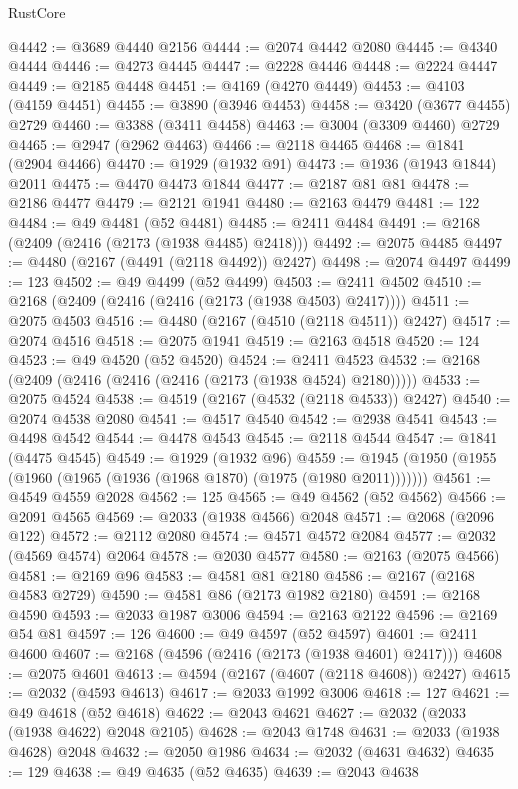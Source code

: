 \begin{lexlean}{RustCore}
\begin{coremodule}
@4442 := @3689 @4440 @2156
@4444 := @2074 @4442 @2080
@4445 := @4340 @4444
@4446 := @4273 @4445
@4447 := @2228 @4446
@4448 := @2224 @4447
@4449 := @2185 @4448
@4451 := @4169 (@4270 @4449)
@4453 := @4103 (@4159 @4451)
@4455 := @3890 (@3946 @4453)
@4458 := @3420 (@3677 @4455) @2729
@4460 := @3388 (@3411 @4458)
@4463 := @3004 (@3309 @4460) @2729
@4465 := @2947 (@2962 @4463)
@4466 := @2118 @4465
@4468 := @1841 (@2904 @4466)
@4470 := @1929 (@1932 @91)
@4473 := @1936 (@1943 @1844) @2011
@4475 := @4470 @4473 @1844
@4477 := @2187 @81 @81
@4478 := @2186 @4477
@4479 := @2121 @1941
@4480 := @2163 @4479
@4481 := 122
@4484 := @49 @4481 (@52 @4481)
@4485 := @2411 @4484
@4491 := @2168 (@2409 (@2416 (@2173 (@1938 @4485) @2418)))
@4492 := @2075 @4485
@4497 := @4480 (@2167 (@4491 (@2118 @4492)) @2427)
@4498 := @2074 @4497
@4499 := 123
@4502 := @49 @4499 (@52 @4499)
@4503 := @2411 @4502
@4510 := @2168 (@2409 (@2416 (@2416 (@2173 (@1938 @4503) @2417))))
@4511 := @2075 @4503
@4516 := @4480 (@2167 (@4510 (@2118 @4511)) @2427)
@4517 := @2074 @4516
@4518 := @2075 @1941
@4519 := @2163 @4518
@4520 := 124
@4523 := @49 @4520 (@52 @4520)
@4524 := @2411 @4523
@4532 := @2168 (@2409 (@2416 (@2416 (@2416 (@2173 (@1938 @4524) @2180)))))
@4533 := @2075 @4524
@4538 := @4519 (@2167 (@4532 (@2118 @4533)) @2427)
@4540 := @2074 @4538 @2080
@4541 := @4517 @4540
@4542 := @2938 @4541
@4543 := @4498 @4542
@4544 := @4478 @4543
@4545 := @2118 @4544
@4547 := @1841 (@4475 @4545)
@4549 := @1929 (@1932 @96)
@4559 := @1945 (@1950 (@1955 (@1960 (@1965 (@1936 (@1968 @1870) (@1975 (@1980 @2011)))))))
@4561 := @4549 @4559 @2028
@4562 := 125
@4565 := @49 @4562 (@52 @4562)
@4566 := @2091 @4565
@4569 := @2033 (@1938 @4566) @2048
@4571 := @2068 (@2096 @122)
@4572 := @2112 @2080
@4574 := @4571 @4572 @2084
@4577 := @2032 (@4569 @4574) @2064
@4578 := @2030 @4577
@4580 := @2163 (@2075 @4566)
@4581 := @2169 @96
@4583 := @4581 @81 @2180
@4586 := @2167 (@2168 @4583 @2729)
@4590 := @4581 @86 (@2173 @1982 @2180)
@4591 := @2168 @4590
@4593 := @2033 @1987 @3006
@4594 := @2163 @2122
@4596 := @2169 @54 @81
@4597 := 126
@4600 := @49 @4597 (@52 @4597)
@4601 := @2411 @4600
@4607 := @2168 (@4596 (@2416 (@2173 (@1938 @4601) @2417)))
@4608 := @2075 @4601
@4613 := @4594 (@2167 (@4607 (@2118 @4608)) @2427)
@4615 := @2032 (@4593 @4613)
@4617 := @2033 @1992 @3006
@4618 := 127
@4621 := @49 @4618 (@52 @4618)
@4622 := @2043 @4621
@4627 := @2032 (@2033 (@1938 @4622) @2048 @2105)
@4628 := @2043 @1748
@4631 := @2033 (@1938 @4628) @2048
@4632 := @2050 @1986
@4634 := @2032 (@4631 @4632)
@4635 := 129
@4638 := @49 @4635 (@52 @4635)
@4639 := @2043 @4638

\end{coremodule}
\end{lexlean}
